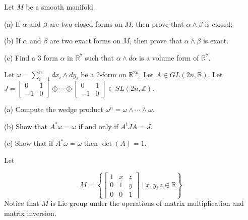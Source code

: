 \documentclass[14pt]{extarticle}
\begin{document}
\newpage
Let $M$ be a smooth manifold.

(a) If $\alpha$ and $\beta$ are two closed forms on $M$, then prove that $\alpha \wedge \beta$ is closed;

(b) If $\alpha$ and $\beta$ are two exact forms on $M$, then prove that $\alpha \wedge \beta$ is exact.

(c) Find a 3 form $\alpha$ in $\mathbb{R}^{7}$ such that $\alpha \wedge d \alpha$ is a volume form of $\mathbb{R}^{7}$.

\newpage
Let $\omega=\sum_{i=1}^{n} d x_{i} \wedge d y_{i}$ be a 2-form on $\mathbb{R}^{2 n}$. Let $A \in G L(2 n, \mathbb{R})$. Let $J=\left[\begin{array}{cc}0 & 1 \\ -1 & 0\end{array}\right] \oplus \cdots \oplus\left[\begin{array}{cc}0 & 1 \\ -1 & 0\end{array}\right] \in S L(2 n, \mathbb{Z}) .$

(a) Compute the wedge product $\omega^{n}=\omega \wedge \cdots \wedge \omega$.

(b) Show that $A^{*} \omega=\omega$ if and only if $A^{t} J A=J$.

(c) Show that if $A^{*} \omega=\omega$ then $\operatorname{det}(A)=1$.

\newpage
Let

$$
M=\left\{\left[\begin{array}{ccc}
1 & x & z \\
0 & 1 & y \\
0 & 0 & 1
\end{array}\right] \mid x, y, z \in \mathbb{R}\right\}
$$
Notice that $M$ is Lie group under the operations of matrix multiplication and matrix inversion.
\end{document}
